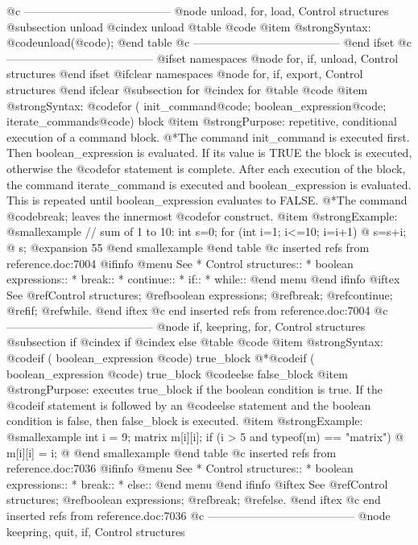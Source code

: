 {{{{{{{{@c ---------------------------------------
@node unload, for, load, Control structures
@subsection unload
@cindex unload
@table @code
@item @strong{Syntax:}
@code{unload(}@code{);}
@end table
@c ---------------------------------------
@end ifset
@c ---------------------------------------
@ifset namespaces
@node for, if, unload, Control structures
@end ifset
@ifclear namespaces
@node for, if, export, Control structures
@end ifclear
@subsection for
@cindex for
@table @code
@item @strong{Syntax:}
@code{for (} init_command@code{;}
boolean_expression@code{;}
iterate_commands@code{)} block
@item @strong{Purpose:}
repetitive, conditional execution of a command block.
@*The command init_command is executed first. Then boolean_expression is
evaluated. If its value is TRUE the block is executed, otherwise the
@code{for} statement is complete. After each execution of the block, the
command iterate_command is executed and boolean_expression is
evaluated. This is repeated until boolean_expression evaluates to FALSE.
@*The command @code{break;} leaves the innermost @code{for} construct.
@item @strong{Example:}
@smallexample
// sum of 1 to 10:
int s=0;
for (int i=1; i<=10; i=i+1)
@{
   s=s+i;
@}
s;
@expansion{} 55
@end smallexample
@end table
@c inserted refs from reference.doc:7004
@ifinfo
@menu
See
* Control structures::
* boolean expressions::
* break::
* continue::
* if::
* while::
@end menu
@end ifinfo
@iftex
See
@ref{Control structures};
@ref{boolean expressions};
@ref{break};
@ref{continue};
@ref{if};
@ref{while}.
@end iftex
@c end inserted refs from reference.doc:7004
@c ---------------------------------------
@node if, keepring, for, Control structures
@subsection if
@cindex if
@cindex else
@table @code
@item @strong{Syntax:}
@code{if (} boolean_expression @code{)} true_block
@*@code{if (} boolean_expression @code{)} true_block @code{else} false_block
@item @strong{Purpose:}
executes true_block if the boolean condition is true. If the @code{if}
statement is followed by an @code{else} statement and the boolean
condition is false, then false_block is executed.
@item @strong{Example:}
@smallexample
int i = 9;
matrix m[i][i];
if (i > 5 and typeof(m) == "matrix")
@{
  m[i][i] = i;
@}
@end smallexample
@end table
@c inserted refs from reference.doc:7036
@ifinfo
@menu
See
* Control structures::
* boolean expressions::
* break::
* else::
@end menu
@end ifinfo
@iftex
See
@ref{Control structures};
@ref{boolean expressions};
@ref{break};
@ref{else}.
@end iftex
@c end inserted refs from reference.doc:7036
@c ---------------------------------------
@node keepring, quit, if, Control structures
}}}}}}}}
